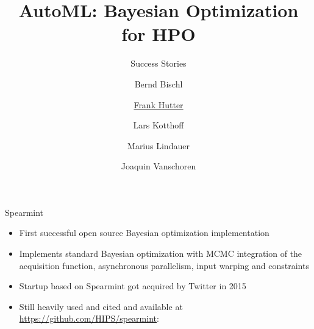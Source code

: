 


\title{AutoML: Bayesian Optimization for HPO}
\subtitle{Success Stories}
\author[Marius Lindauer]{Bernd Bischl \and \underline{Frank Hutter} \and Lars Kotthoff\newline \and Marius Lindauer \and Joaquin Vanschoren}
\institute{}
\date{}
    
    
    

\maketitle

\begin{frame}[c]{Spearmint }

\small
\begin{itemize}
    \item First successful open source Bayesian optimization implementation     
    \item Implements standard Bayesian optimization with MCMC integration of the acquisition function, asynchronous parallelism, 
    input warping 
    and constraints
    \item \alert{Startup based on Spearmint got acquired by Twitter in 2015}
    \item Still heavily used and cited and available at \url{https://github.com/HIPS/spearmint}:
    \begin{center}
        
        
    \end{center}
\end{itemize}
\end{frame}


